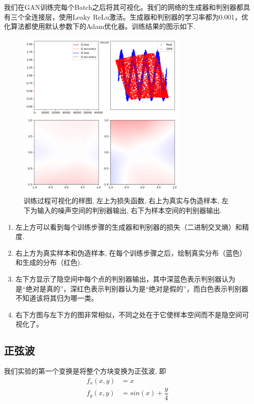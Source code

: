 \documentclass[lang=cn,11pt]{elegantpaper}
\begin{document}
我们在GAN训练完每个Batch之后将其可视化。我们的网络的生成器和判别器都具有三个全连接层，使用Leaky ReLu激活。生成器和判别器的学习率都为0.001，优化算法都使用默认参数下的Adam优化器。训练结果的图示如下.

\begin{figure}[hbt]
\centering
  \includegraphics[width=0.75\textwidth]{sin_2_1}
  \caption{训练过程可视化的样图, 左上为损失函数, 右上为真实与伪造样本, 左下为输入的噪声空间的判别器输出, 右下为样本空间的判别器输出.}
\end{figure}

\begin{enumerate}
	\item 左上方可以看到每个训练步骤的生成器和判别器的损失（二进制交叉熵）和精度.
	\item 右上方为真实样本和伪造样本, 在每个训练步骤之后，绘制真实分布（蓝色）和生成的分布（红色).
	\item 左下方显示了隐空间中每个点的判别器输出，其中深蓝色表示判别器认为是“绝对是真的”，深红色表示判别器认为是“绝对是假的”，而白色表示判别器不知道该将其归为哪一类。
	\item 右下方图与左下方的图非常相似，不同之处在于它使样本空间而不是隐空间可视化了。
\end{enumerate}

\subsection{正弦波}

我们实验的第一个变换是将整个方块变换为正弦波, 即
\begin{align}
	f_x(x,y)&=x\\
	f_y(x,y)&=sin(x)+\dfrac{y}{4}
\end{align}
\end{document}
